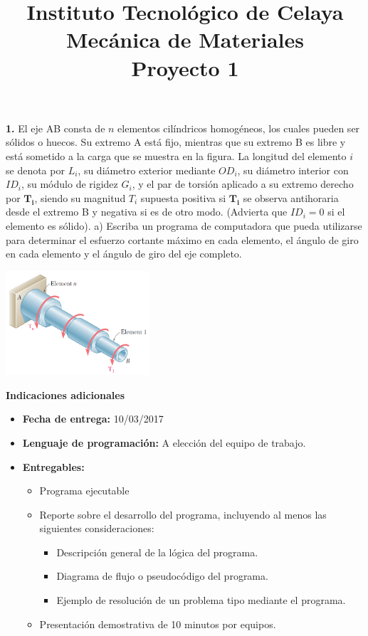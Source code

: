 \documentclass[12pt,letterpaper]{article}
\title{
\vspace{-15mm}
{\large Instituto Tecnológico de Celaya} \\[-2mm]
{\large Mecánica de Materiales} \\[-2mm]
{\large Proyecto 1} \\[-2mm]
}
\date{}
\begin{document}
\maketitle
\vspace{-10mm}

\textbf{1.} El eje AB consta de $n$ elementos cilíndricos homogéneos, los cuales pueden ser sólidos 
o huecos. Su extremo A está fijo, mientras que su extremo B es libre y está sometido a la 
carga que se muestra en la figura. La longitud del elemento $i$ se denota por $L_i$, su 
diámetro exterior mediante $OD_i$, su diámetro interior con $ID_i$, su módulo de rigidez 
$G_i$, y el par de torsión aplicado a su extremo derecho por $\mathbf{T_i}$, siendo su 
magnitud $T_i$ supuesta positiva si $\mathbf{T_i}$ se observa antihoraria desde el extremo 
B y negativa si es de otro modo. (Advierta que $ID_i = 0$ si el elemento es sólido). 
a) Escriba un programa de computadora que pueda utilizarse para determinar el esfuerzo 
cortante máximo en cada elemento, el ángulo de giro en cada elemento y el ángulo 
de giro del eje completo.

\begin{center}
\includegraphics[width=0.4\textwidth]{img/p1.png}
\end{center}


\textbf{Indicaciones adicionales}

\begin{itemize}[itemsep=0,label={o}]
\item \textbf{Fecha de entrega:} 10/03/2017
\item \textbf{Lenguaje de programación:} A elección del equipo de trabajo.
\item \textbf{Entregables:}
    \begin{itemize}[itemsep=0,label={-}]
        \item Programa ejecutable
        \item Reporte sobre el desarrollo del programa, incluyendo al menos las siguientes consideraciones:
            \begin{itemize}[itemsep=0,label={$\cdot$}]
                \item Descripción general de la lógica del programa.
                \item Diagrama de flujo o pseudocódigo del programa.
                \item Ejemplo de resolución de un problema tipo mediante el programa.
            \end{itemize}
        \item Presentación demostrativa de 10 minutos por equipos.
    \end{itemize}
\end{itemize}
\end{document}
